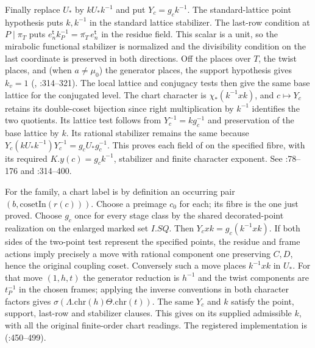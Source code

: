 Finally replace $U_*$ by $kU_*k^{-1}$ and put $Y_c=g_c k^{-1}$.
The standard-lattice point hypothesis puts $k,k^{-1}$ in the
standard lattice stabilizer. The last-row condition at $P\mid\pi_T$
puts $e_n^{\mathsf t}k_P^{-1}=\overline{\pi_T}\,e_n^{\mathsf t}$
in the residue field. This scalar is a unit, so the mirabolic
functional stabilizer is normalized and the divisibility condition
on the last coordinate is preserved in both directions. Off the
places over $T$, the twist places, and (when $a\ne\mu_0$) the generator
places, the support hypothesis gives $k_v=1$ (,
:314--321). The
local lattice and conjugacy tests then give the same base lattice
for the conjugated level. The chart character is $\chi_*(k^{-1}xk)$,
and $c\mapsto Y_c$ retains its double-coset bijection since right
multiplication by $k^{-1}$ identifies the two quotients. Its lattice
test follows from $Y_c^{-1}=k g_c^{-1}$ and preservation of the base
lattice by $k$. Its rational stabilizer remains the same because
$Y_c(kU_*k^{-1})Y_c^{-1}=g_c U_*g_c^{-1}$. This proves each
field of  on the specified fibre, with its
required $K.y(c)=g_c k^{-1}$, stabilizer and finite character exponent.
See :78--176 and
:314--400.

For the family, a chart label is by definition an occurring pair
$(b,\mathrm{cosetIn}(r(c)))$. Choose a preimage $c_0$ for each;
its fibre is the one just proved. Choose $g_c$ once for every stage
class by the shared decorated-point realization on the enlarged
marked set $I.SQ$. Then $Y_c x k=g_c(k^{-1}xk)$. If both sides
of the two-point test represent the specified points, the residue
and frame actions imply precisely a move with rational component
one preserving $C,D$, hence the original coupling coset. Conversely
such a move places $k^{-1}xk$ in $U_*$. For that move $(1,h,t)$
the generator reduction is $h^{-1}$ and the twist components are
$t_P^{-1}$ in the chosen frames; applying the inverse conventions in
both character factors gives $\sigma(\Lambda.\mathrm{chr}(h)
\Theta.\mathrm{chr}(t))$. The same $Y_c$ and $k$ satisfy the point,
support, last-row and stabilizer clauses. This gives
 on
its supplied admissible $k$, with all the original finite-order
chart readings. The registered implementation is 
(:450--499).

